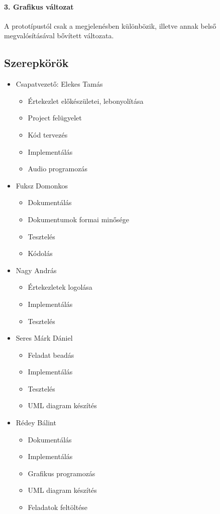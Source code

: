 \paragraph{3.	Grafikus változat}
A prototípustól csak a megjelenésben különbözik, illetve annak belső megvalósításával bővített változata.

\subsection{Szerepkörök}
\begin{itemize}


\item{Csapatvezető: Elekes Tamás}
\begin{itemize}
\item{Értekezlet előkészületei, lebonyolítása }
\item{Project felügyelet}
\item{Kód tervezés}
\item{Implementálás}
\item{Audio programozás}
\end{itemize}
\item{Fuksz Domonkos}
\begin{itemize}
\item{Dokumentálás}
\item{Dokumentumok formai minősége}
\item{Tesztelés}
\item{Kódolás}
\end{itemize}
\item{Nagy András}
\begin{itemize}
\item{Értekezletek logolása}
\item{Implementálás}
\item{Tesztelés}
\end{itemize}
\item{Seres Márk Dániel}
\begin{itemize}
\item{Feladat beadás}
\item{Implementálás}
\item{Tesztelés}
\item{UML diagram készítés}
\end{itemize}
\item{Rédey Bálint}
\begin{itemize}
\item{Dokumentálás}
\item{Implementálás}
\item{Grafikus programozás}
\item{UML diagram készítés}
\item{Feladatok feltöltése}
\end{itemize}
\end{itemize}

